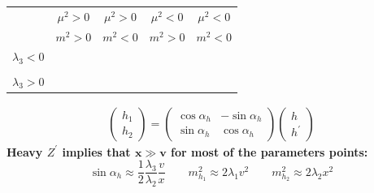\documentclass[10pt,xcolor=dvipsnames,mathserif]{beamer}
\newcommand{\xmark}{\ding{55}}%
\renewcommand{\(}{\left(}
\renewcommand{\)}{\right)}
\renewcommand{\[}{\left[}
\renewcommand{\]}{\right]}
\newcommand{\red}[0]{\color{red}}
\begin{document}
\begin{frame}
	\begin{table}[htb!]
		\begin{center}
			\begin{tabular}{ccccc}
				\toprule                     
				& $\mu^2 > 0$ & $\mu^2 > 0$ & $\mu^2 < 0$ & {\red $\mu^2 < 0$}  	\\
				& $m^2 > 0$ & $m^2 < 0$ & $m^2 > 0$ & {\red $m^2 < 0$}  	\\        
				\midrule
				$\lambda_3 < 0 $     			    							& \xmark		& \checkmark	&	\checkmark & {\red \checkmark}	\\
				& 		& 	&	 & 	\\
				$\lambda_3 > 0$     			    							& \xmark		& \xmark	&	\xmark & {\red \checkmark}	\\
				\bottomrule
			\end{tabular} 
		\end{center}
	\end{table} 
\vskip3mm
	\begin{equation*}
	\begin{aligned}
	\begin{pmatrix}
	h_1 \\
	h_2 
	\end{pmatrix}
	=
	\begin{pmatrix}
	\cos \alpha_h & -\sin \alpha_h \\
	\sin \alpha_h & \cos \alpha_h 
	\end{pmatrix}
	\begin{pmatrix}
	h \\
	h^\prime 
	\end{pmatrix}
	\end{aligned}
	\end{equation*}
	\vskip0.1mm
	{\bf Heavy $Z^\prime$ implies that $\bm{x \gg v}$ for most of the parameters points:}
	\begin{equation*}
	\sin \alpha_h \approx \dfrac{1}{2}\dfrac{\lambda_3}{\lambda_2} \dfrac{v}{x} \qquad
		m_{h_1}^2 \approx 2 \lambda_1 v^2 \qquad m_{h_2}^2 \approx 2 \lambda_2 x^2
	\end{equation*}

\end{frame}
\end{document}
